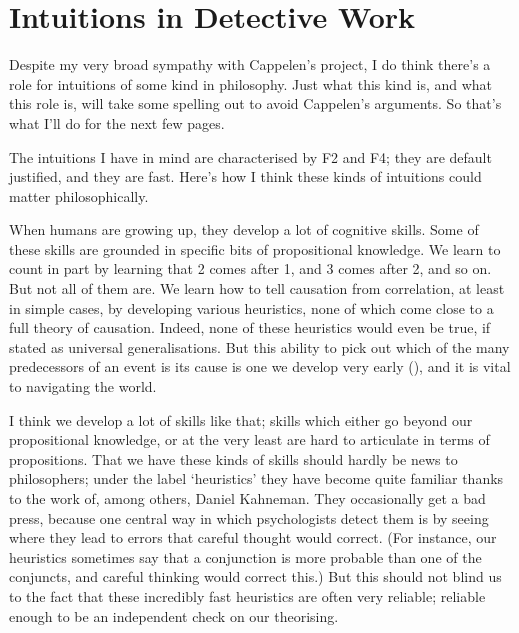 \documentclass[
  10pt,
  letterpaper,
  DIV=11,
  numbers=noendperiod,
  twoside]{scrartcl}
\begin{document}
\section{Intuitions in Detective Work}\label{sec-Detective}

Despite my very broad sympathy with Cappelen's project, I do think
there's a role for intuitions of some kind in philosophy. Just what this
kind is, and what this role is, will take some spelling out to avoid
Cappelen's arguments. So that's what I'll do for the next few pages.

The intuitions I have in mind are characterised by F2 and F4; they are
default justified, and they are fast. Here's how I think these kinds of
intuitions could matter philosophically.

When humans are growing up, they develop a lot of cognitive skills. Some
of these skills are grounded in specific bits of propositional
knowledge. We learn to count in part by learning that 2 comes after 1,
and 3 comes after 2, and so on. But not all of them are. We learn how to
tell causation from correlation, at least in simple cases, by developing
various heuristics, none of which come close to a full theory of
causation. Indeed, none of these heuristics would even be true, if
stated as universal generalisations. But this ability to pick out which
of the many predecessors of an event is its cause is one we develop very
early (), and it is vital
to navigating the world.

I think we develop a lot of skills like that; skills which either go
beyond our propositional knowledge, or at the very least are hard to
articulate in terms of propositions. That we have these kinds of skills
should hardly be news to philosophers; under the label `heuristics' they
have become quite familiar thanks to the work of, among others, Daniel
Kahneman. They occasionally get a bad press, because one central way in
which psychologists detect them is by seeing where they lead to errors
that careful thought would correct. (For instance, our heuristics
sometimes say that a conjunction is more probable than one of the
conjuncts, and careful thinking would correct this.) But this should not
blind us to the fact that these incredibly fast heuristics are often
very reliable; reliable enough to be an independent check on our
theorising.
\end{document}
